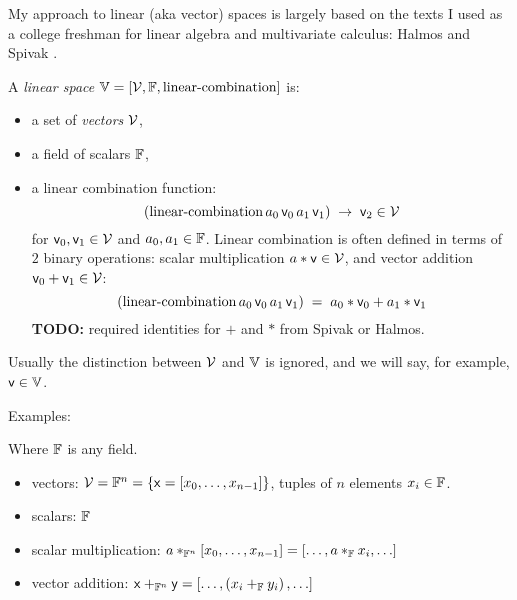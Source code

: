 \label{sec:Linear-spaces}

My approach to linear (aka vector) spaces is largely based on
the texts I used as a college freshman for linear algebra and
multivariate calculus: Halmos \cite{halmos-1958}
and Spivak \cite{spivak-1965}.

\begin{definition}
\bigskip
A \textit{linear space} 
${\mathbb{V}} = \left[ {\mathcal{V}}, {\mathbb{F}}, \text{linear-combination} \right]$
 is:
\begin{itemize}
  \item a set of \textit{vectors} ${\mathcal{V}}$,
  \item a field  of scalars ${\mathbb{F}}$,
  \item a linear combination function: 
\begin{equation}
\left( \text{linear-combination} 
\, a_0 \, {\mathsf{v}}_0 \, a_1 \, {\mathsf{v}}_1 \right) \; 
 \rightarrow \; {\mathsf{v}}_2  \in {\mathcal{V}}
\end{equation}
for ${\mathsf{v}}_0, {\mathsf{v}}_1 \in {\mathcal{V}} $
and $a_0, a_1 \in {\mathbb{F}}$.
Linear combination is often defined in terms of
$2$ binary operations:
scalar multiplication $a * {\mathsf{v}} \in {\mathcal{V}}$,
and vector addition ${\mathsf{v}}_0 + {\mathsf{v}}_1 \in {\mathcal{V}}$:
\begin{equation}
\left( \text{linear-combination} 
\, a_0 \, {\mathsf{v}}_0 \, a_1 \, {\mathsf{v}}_1 \right) \; 
= \; a_0*{\mathsf{v}}_0 + a_1*{\mathsf{v}}_1
\end{equation}
\textbf{TODO:} required identities for $+$ and $*$ from Spivak or Halmos.
\end{itemize}
\end{definition}
Usually the distinction between ${\mathcal{V}}$ and ${\mathbb{V}}$ 
is ignored, and we will say, for example, 
${\mathsf{v}} \in {\mathbb{V}}$.

Examples:

\begin{example}[$\Space{F}^n$]
Where ${\mathbb{F}}$ is any field.
\begin{itemize}
  \item vectors:
  ${\mathcal{V}} = {\mathbb{F}}^n = \{ {\mathsf{x}}
  = \left[ x_0, \ldots , x_{n-1} \right] \}$,
  tuples of $n$ elements $x_i \in {\mathbb{F}}$.
  \item scalars: ${\mathbb{F}}$
  \item scalar multiplication:
  $ a *_{{\mathbb{F}}^n} \left[ x_0, \ldots , x_{n-1} \right] =
  \left[ \ldots , a *_{{\mathbb{F}}} x_{i} , \ldots \right]$
  \item vector addition:
  ${\mathsf{x}} +_{{\mathbb{F}}^n} {\mathsf{y}}
  = \left[ \ldots , \left( x_i +_{{\mathbb{F}}} y_i \right) ,\ldots \right]$
\end{itemize}
\end{example}

